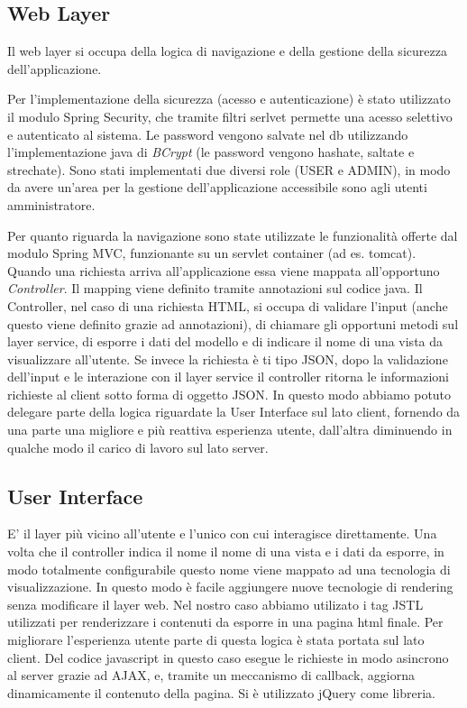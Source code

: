 \subsection{Web Layer}

Il web layer si occupa della logica di navigazione e della
gestione della sicurezza dell'applicazione. 

Per l'implementazione della sicurezza (acesso e autenticazione) è
stato utilizzato il modulo Spring Security, che tramite filtri serlvet
permette una acesso selettivo e autenticato al sistema. Le password
vengono salvate nel db utilizzando l'implementazione java di
\emph{BCrypt} (le password vengono hashate, saltate e strechate). Sono
stati implementati due diversi role (USER e ADMIN), in modo da avere
un'area per la gestione dell'applicazione accessibile sono agli utenti
amministratore.


Per quanto riguarda la navigazione sono state utilizzate le
funzionalità offerte dal modulo Spring MVC, funzionante su un servlet
container (ad es. tomcat). Quando una richiesta arriva
all'applicazione essa viene mappata all'opportuno
\emph{Controller}. Il mapping viene definito tramite annotazioni sul
codice java. Il Controller, nel caso di una richiesta HTML, si occupa
di validare l'input (anche questo viene definito grazie ad
annotazioni), di chiamare gli opportuni metodi sul layer service, di
esporre i dati del modello e di indicare il nome di una vista da
visualizzare all'utente. Se invece la richiesta è ti tipo JSON, dopo
la validazione dell'input e le interazione con il layer service il
controller ritorna le informazioni richieste al client sotto forma di
oggetto JSON. In questo modo abbiamo potuto delegare parte della
logica riguardate la User Interface sul lato client, fornendo da una
parte una migliore e più reattiva esperienza utente, dall'altra
diminuendo in qualche modo il carico di lavoro sul lato server.

\subsection{User Interface}

E' il layer più vicino all'utente e l'unico con cui interagisce
direttamente. Una volta che il controller indica il nome il nome di
una vista e i dati da esporre, in modo totalmente configurabile questo
nome viene mappato ad una tecnologia di visualizzazione. In questo
modo è facile aggiungere nuove tecnologie di rendering senza
modificare il layer web. Nel nostro caso abbiamo utilizato i tag JSTL
utilizzati per renderizzare i contenuti da esporre in una pagina html
finale.  Per migliorare l'esperienza utente parte di questa logica è
stata portata sul lato client. Del codice javascript in questo caso
esegue le richieste in modo asincrono al server grazie ad AJAX, e,
tramite un meccanismo di callback, aggiorna dinamicamente il contenuto
della pagina. Si è utilizzato jQuery come libreria.


